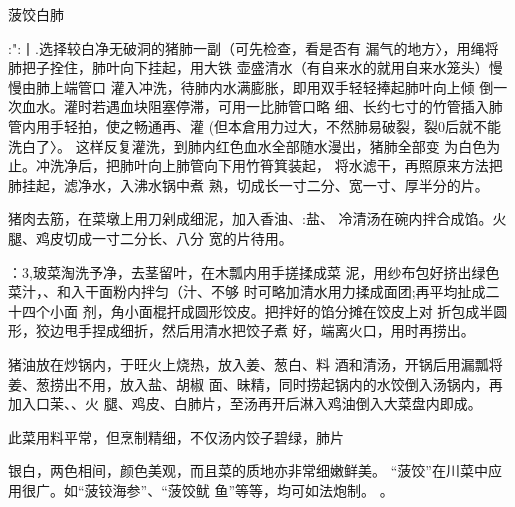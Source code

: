 \begin{recipe}[菠饺银肺]{菠饺白肺}

\ingredients


\cooking

:":丨.选择较白净无破洞的猪肺一副（可先检查，看是否有 漏气的地方〉，用绳将肺把子拴住，肺叶向下挂起，用大铁 壶盛清水（有自来水的就用自来水笼头）慢慢由肺上端管口 灌入冲洗，待肺内水满膨胀，即用双手轻轻捧起肺叶向上倾 倒一次血水。灌时若遇血块阻塞停滞，可用一比肺管口略 细、长约七寸的竹管插入肺管内用手轻拍，使之畅通再、灌 (但本倉用力过大，不然肺易破裂，裂0后就不能洗白了〉。 这样反复灌洗，到肺内红色血水全部随水漫出，猪肺全部变 为白色为止。冲洗净后，把肺叶向上肺管向下用竹筲箕装起， 将水滤干，再照原来方法把肺挂起，滤净水，入沸水锅中煮 熟，切成长一寸二分、宽一寸、厚半分的片。

\step 猪肉去筋，在菜墩上用刀剁成细泥，加入香油、:盐、 冷清汤在碗内拌合成馅。火腿、鸡皮切成一寸二分长、八分 宽的片待用。

：3,玻菜淘洗予净，去茎留叶，在木瓢内用手搓揉成菜 泥，用纱布包好挤出绿色菜汁，、和入干面粉内拌匀（汁、不够 时可略加清水用力揉成面团;再平均扯成二十四个小面 剂，角小面棍扞成圆形饺皮。把拌好的馅分摊在饺皮上对 折包成半圆形，狡边甩手捏成细折，然后用清水把饺子煮 好，端离火口，用时再捞出。

\step 猪油放在炒锅内，于旺火上烧热，放入姜、葱白、料 酒和清汤，开锅后用漏瓢将姜、葱捞出不用，放入盐、胡椒 面、昧精，同时捞起锅内的水饺倒入汤锅内，再加入口茉、、火 腿、鸡皮、白肺片，至汤再开后淋入鸡油倒入大菜盘内即成。

\notes

此菜用料平常，但烹制精细，不仅汤内饺子碧绿，肺片

银白，两色相间，颜色美观，而且菜的质地亦非常细嫩鲜美。 “菠饺”在川菜中应用很广。如“菠铰海参”、“菠饺鱿 鱼”等等，均可如法炮制。	。

\end{recipe}

